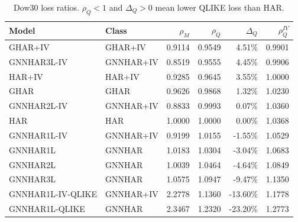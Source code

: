 \begin{table}[H]
\centering
\scriptsize
\begin{tabular}{llrrrr}
\toprule
Model & Class & $\rho_M$ & $\rho_Q$ & $\Delta_Q$ & $\rho_Q^{IV}$ \\
\midrule
GHAR+IV & GHAR+IV & 0.9114 & 0.9549 & 4.51\% & 0.9901 \\
GNNHAR3L-IV & GNNHAR+IV & 0.8519 & 0.9555 & 4.45\% & 0.9906 \\
HAR+IV & HAR+IV & 0.9285 & 0.9645 & 3.55\% & 1.0000 \\
GHAR & GHAR & 0.9626 & 0.9868 & 1.32\% & 1.0230 \\
GNNHAR2L-IV & GNNHAR+IV & 0.8833 & 0.9993 & 0.07\% & 1.0360 \\
HAR & HAR & 1.0000 & 1.0000 & 0.00\% & 1.0368 \\
GNNHAR1L-IV & GNNHAR+IV & 0.9199 & 1.0155 & -1.55\% & 1.0529 \\
GNNHAR1L & GNNHAR & 1.0183 & 1.0304 & -3.04\% & 1.0683 \\
GNNHAR2L & GNNHAR & 1.0039 & 1.0464 & -4.64\% & 1.0849 \\
GNNHAR3L & GNNHAR & 1.0575 & 1.0947 & -9.47\% & 1.1350 \\
GNNHAR1L-IV-QLIKE & GNNHAR+IV & 2.2778 & 1.1360 & -13.60\% & 1.1778 \\
GNNHAR1L-QLIKE & GNNHAR & 2.3467 & 1.2320 & -23.20\% & 1.2773 \\
\bottomrule
\end{tabular}
\caption{Dow30 loss ratios.  \(\rho_Q<1\) and \(\Delta_Q>0\) mean lower QLIKE loss than HAR.}
\label{tab:dow30-loss}
\end{table}
